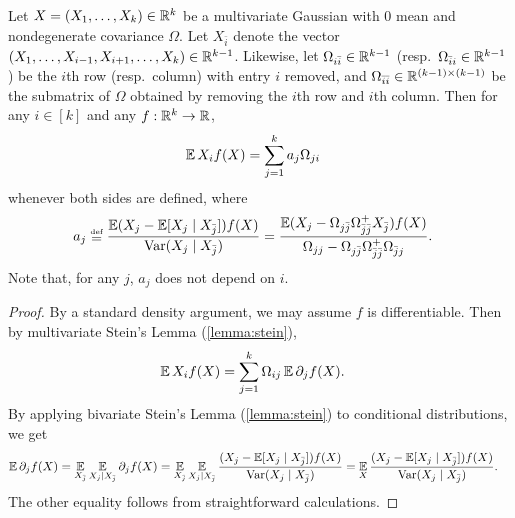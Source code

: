 \documentclass[main.tex]{subfiles}
\begin{document}
\begin{lemma}\label{lemma:EXf}
Let $X = (X_1, \ldots, X_k) \in \mathbb{R}^k$ be a multivariate Gaussian with 0 mean and nondegenerate covariance $\Omega$.
Let $X_{\bar i}$ denote the vector $(X_1, \ldots, X_{i-1}, X_{i+1}, \ldots, X_k) \in \mathbb{R}^{k-1}$.
Likewise, let $\Omega_{i \bar i} \in \mathbb{R}^{k-1}$ (resp.\ $\Omega_{\bar i i} \in \mathbb{R}^{k-1}$) be the $i$th row (resp.\ column) with entry $i$ removed,
and $\Omega_{\bar i \bar i} \in \mathbb{R}^{(k-1) \times (k-1)}$ be the submatrix of $\Omega$ obtained by removing the $i$th row and $i$th column.
Then for any $i \in [k]$ and any $f: \mathbb{R}^k \to \mathbb{R}$,
\begin{align*}
\operatorname*{\mathbb{E}} X_i f(X)
  &=
    \sum_{j=1}^k a_j \Omega_{ji}
\end{align*}
whenever both sides are defined,
where
\begin{align*}
a_j
  &\defeq
    \f{\EV (X_j - \EV[X_j \mid X_{\bar j}]) f(X)}
    {\Var(X_j \mid X_{\bar j})}
  =
    \f{\EV (X_j - \Omega_{j\bar j} \Omega_{\bar j\bar j}^+ X_{\bar j}) f(X)}
    {\Omega_{jj} - \Omega_{j\bar j} \Omega_{\bar j\bar j}^+ \Omega_{\bar j j}}
    .
\end{align*}
Note that, for any $j$, $a_j$ does not depend on $i$.
\end{lemma}
\begin{proof}
By a standard density argument, we may assume $f$ is differentiable.
Then by multivariate Stein's Lemma (\cref{lemma:stein}),
\begin{align*}
\operatorname*{\mathbb{E}} X_i f(X)
  &=
    \sum_{j=1}^k \Omega_{ij} \operatorname*{\mathbb{E}} \partial_j f(X)
    .
\end{align*}
By applying bivariate Stein's Lemma (\cref{lemma:stein}) to conditional distributions, we get
\begin{align*}
\operatorname*{\mathbb{E}} \partial_j f(X)
  &=
    \operatorname*{\mathbb{E}}_{X_{\bar j}} \operatorname*{\mathbb{E}}_{X_j | X_{\bar j}} \partial_j f(X)
  =
    \operatorname*{\mathbb{E}}_{X_{\bar j}}
    \operatorname*{\mathbb{E}}_{X_j | X_{\bar j}}
      \frac{(X_j - \operatorname*{\mathbb{E}}[X_j \mid X_{\bar j}]) f(X)}{\operatorname*{\operatorname{Var}}(X_j \mid X_{\bar j})}
  =
    \operatorname*{\mathbb{E}}_{X}
      \frac{(X_j - \operatorname*{\mathbb{E}}[X_j \mid X_{\bar j}]) f(X)}{\operatorname*{\operatorname{Var}}(X_j \mid X_{\bar j})}
      .
\end{align*}
The other equality follows from straightforward calculations.
\end{proof}
\end{document}
